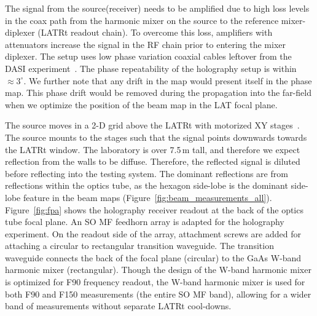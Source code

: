 The signal from the source(receiver) needs to be amplified due to high loss levels in the coax path from the harmonic mixer on the source to the reference mixer-diplexer (LATRt readout chain).  To overcome this loss, amplifiers with attenuators  increase the signal in the RF chain prior to entering the mixer diplexer.  The setup uses low phase variation coaxial cables leftover from the DASI experiment~\cite{CHURCH20031083}.  The phase repeatability of the holography setup is within $\approx3^{\circ}$.  We further note that any drift in the map would present itself in the phase map.  This phase drift would be removed during the propagation into the far-field when we optimize the position of the beam map in the LAT focal plane. 

The source moves in a 2-D grid above the LATRt with motorized XY stages~\cite{stages}.  The source mounts to the stages such that the signal points downwards towards the LATRt window.  The laboratory is over 7.5\,m tall, and therefore we expect reflection from the walls to be diffuse.  Therefore, the reflected signal is diluted before reflecting into the testing system.  The dominant reflections are from reflections within the optics tube, as the hexagon side-lobe is the dominant side-lobe feature in the beam maps (Figure~\ref{fig:beam_measurements_all}).
Figure~\ref{fig:fpa} shows the holography receiver readout at the back of the optics tube focal plane.  An SO MF feedhorn array is adapted for the holography experiment.  On the readout side of the array, attachment screws are added for attaching a circular to rectangular transition waveguide.  The transition waveguide connects the back of the focal plane (circular) to the GaAs W-band harmonic mixer (rectangular).  Though the design of the W-band harmonic mixer is optimized for F90 frequency readout, the W-band harmonic mixer is used for both F90 and F150 measurements (the entire SO MF band), allowing for a wider band of measurements without separate LATRt cool-downs.
